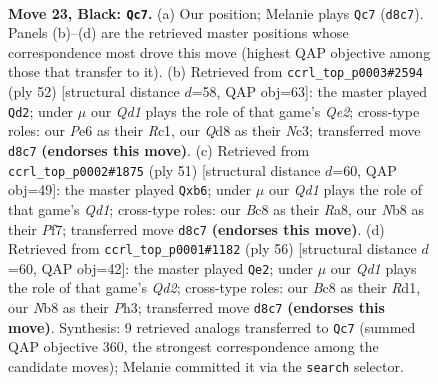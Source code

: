\documentclass[11pt]{article}
\begin{document}
\clearpage

\begin{figure}[p]\centering
\begin{subfigure}{0.46\textwidth}\centering
\resizebox{\linewidth}{!}{%
\newchessgame
\chessboard[
  setfen={rnbqk3/p7/2p1p1p1/P1PpP1P1/1P6/2P5/8/R1BQK1N1 b Qq - 0 23},
  showmover=false,
  pgfstyle=straightmove, color=movearrow, markmove={d8-c7}
]}
\caption{}
\end{subfigure}\hfill
\begin{subfigure}{0.46\textwidth}\centering
\resizebox{\linewidth}{!}{%
\newchessgame
\chessboard[
  setfen={1k4r1/1p3p2/p3b2q/3p4/P2Pp3/1PN1P3/1K2QP2/2R5 w - - 0 27},
  showmover=false,
  pgfstyle=straightmove, color=movearrow, markmove={e2-d2}
]}
\caption{}
\end{subfigure}
\\[4pt]
\begin{subfigure}{0.46\textwidth}\centering
\resizebox{\linewidth}{!}{%
\newchessgame
\chessboard[
  setfen={r2q2k1/5ppp/1Pp5/1n1p1P2/pP1P4/P3B2P/2Q3P1/4R1K1 b - - 0 26},
  showmover=false,
  pgfstyle=straightmove, color=movearrow, markmove={d8-b6}
]}
\caption{}
\end{subfigure}\hfill
\begin{subfigure}{0.46\textwidth}\centering
\resizebox{\linewidth}{!}{%
\newchessgame
\chessboard[
  setfen={q3r1k1/6bp/pp2p1p1/3p4/P5PB/2P2P1P/1P1Q2K1/3R4 w - - 0 29},
  showmover=false,
  pgfstyle=straightmove, color=movearrow, markmove={d2-e2}
]}
\caption{}
\end{subfigure}
\caption{\textbf{Move 23, Black: \texttt{Qc7}.} (a) Our position; Melanie plays \texttt{Qc7} (\texttt{d8c7}). Panels (b)--(d) are the retrieved master positions whose correspondence most drove this move (highest QAP objective among those that transfer to it). (b) Retrieved from \texttt{ccrl\_top\_p0003\#2594} (ply 52) [structural distance $d$=58, QAP obj=63]: the master played \texttt{Qd2}; under $\mu$ our \emph{Qd1} plays the role of that game's \emph{Qe2}; cross-type roles: our \emph{P}e6 as their \emph{R}c1, our \emph{Q}d8 as their \emph{N}c3; transferred move \texttt{d8c7} \textbf{(endorses this move)}. (c) Retrieved from \texttt{ccrl\_top\_p0002\#1875} (ply 51) [structural distance $d$=60, QAP obj=49]: the master played \texttt{Qxb6}; under $\mu$ our \emph{Qd1} plays the role of that game's \emph{Qd1}; cross-type roles: our \emph{B}c8 as their \emph{R}a8, our \emph{N}b8 as their \emph{P}f7; transferred move \texttt{d8c7} \textbf{(endorses this move)}. (d) Retrieved from \texttt{ccrl\_top\_p0001\#1182} (ply 56) [structural distance $d$=60, QAP obj=42]: the master played \texttt{Qe2}; under $\mu$ our \emph{Qd1} plays the role of that game's \emph{Qd2}; cross-type roles: our \emph{B}c8 as their \emph{R}d1, our \emph{N}b8 as their \emph{P}h3; transferred move \texttt{d8c7} \textbf{(endorses this move)}. Synthesis: 9 retrieved analogs transferred to \texttt{Qc7} (summed QAP objective 360, the strongest correspondence among the candidate moves); Melanie committed it via the \texttt{search} selector.}
\label{fig:thought-m45}
\end{figure}
\end{document}
